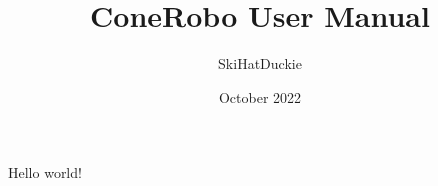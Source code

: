 \documentclass{article}
\title{ConeRobo User Manual}
\author{SkiHatDuckie}
\date{October 2022}
\begin{document}
   \maketitle
   Hello world!
\end{document}
